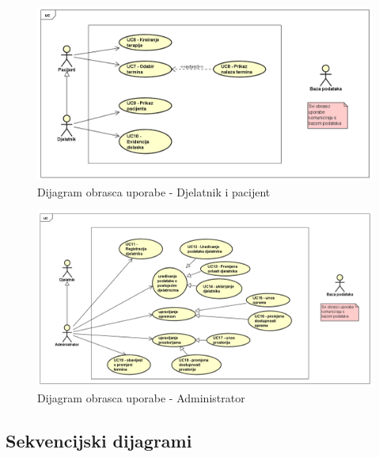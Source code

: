 					\begin{figure}[H]
						\includegraphics[scale=0.45]{slike/dijagram_obrasca_uporabe2.PNG} %
						\centering
						\caption{Dijagram obrasca uporabe - Djelatnik i pacijent}
						\label{fig:dijagram_UC2}
					\end{figure}
					
					\begin{figure}[H]
						\includegraphics[scale=0.45]{slike/dijagram_obrasca_uporabe3.PNG} %
						\centering
						\caption{Dijagram obrasca uporabe - Administrator}
						\label{fig:dijagram_UC3}
					\end{figure}
					
				\eject		
				
			\subsection{Sekvencijski dijagrami}
				
				\textbf{}
				
